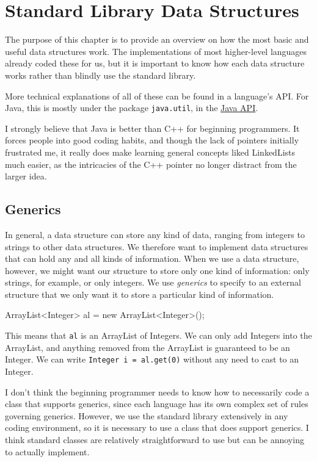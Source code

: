 \chapter{Standard Library Data Structures}
\label{chap:standard_ds}

The purpose of this chapter is to provide an overview on how the most basic and useful data structures work. The implementations of most higher-level languages already coded these for us, but it is important to know how each data structure works rather than blindly use the standard library.

More technical explanations of all of these can be found in a language's API. For Java, this is mostly under the package \texttt{java.util}, in the \href{https://docs.oracle.com/javase/8/docs/api/}{Java API}.

I strongly believe that Java is better than C++ for beginning programmers. It forces people into good coding habits, and though the lack of pointers initially frustrated me, it really does make learning general concepts liked LinkedLists much easier, as the intricacies of the C++ pointer no longer distract from the larger idea.

\section{Generics}
\label{sec:generics}

In general, a data structure can store any kind of data, ranging from integers to strings to other data structures. We therefore want to implement data structures that can hold any and all kinds of information. When we use a data structure, however, we might want our structure to store only one kind of information: only strings, for example, or only integers. We use \textit{generics} to specify to an external structure that we only want it to store a particular kind of information.

\begin{mylstlisting}
ArrayList<Integer> al = new ArrayList<Integer>();
\end{mylstlisting}

This means that \texttt{al} is an ArrayList of Integers. We can only add Integers into the ArrayList, and anything removed from the ArrayList is guaranteed to be an Integer. We can write \texttt{Integer i = al.get(0)} without any need to cast to an Integer.

I don't think the beginning programmer needs to know how to necessarily code a class that supports generics, since each language has its own complex set of rules governing generics. However, we use the standard library extensively in any coding environment, so it is necessary to use a class that does support generics. I think standard classes are relatively straightforward to use but can be annoying to actually implement.


